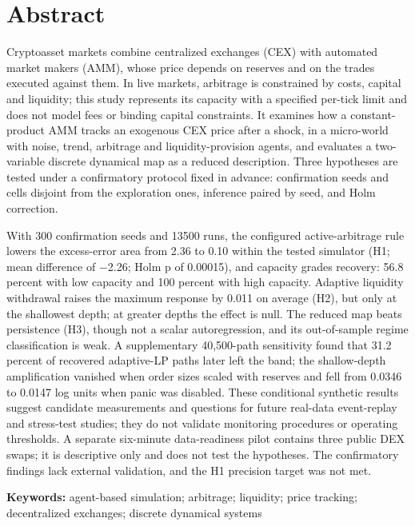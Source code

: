 \section{Abstract}

Cryptoasset markets combine centralized exchanges (CEX) with automated market makers (AMM), whose price depends on reserves and on the trades executed against them. In live markets, arbitrage is constrained by costs, capital and liquidity; this study represents its capacity with a specified per-tick limit and does not model fees or binding capital constraints. It examines how a constant-product AMM tracks an exogenous CEX price after a shock, in a micro-world with noise, trend, arbitrage and liquidity-provision agents, and evaluates a two-variable discrete dynamical map as a reduced description. Three hypotheses are tested under a confirmatory protocol fixed in advance: confirmation seeds and cells disjoint from the exploration ones, inference paired by seed, and Holm correction.

With 300 confirmation seeds and 13500 runs, the configured active-arbitrage rule lowers the excess-error area from 2.36 to 0.10 within the tested simulator (H1; mean difference of −2.26; Holm p of 0.00015), and capacity grades recovery: 56.8 percent with low capacity and 100 percent with high capacity. Adaptive liquidity withdrawal raises the maximum response by 0.011 on average (H2), but only at the shallowest depth; at greater depths the effect is null. The reduced map beats persistence (H3), though not a scalar autoregression, and its out-of-sample regime classification is weak. A supplementary 40,500-path sensitivity found that 31.2 percent of recovered adaptive-LP paths later left the band; the shallow-depth amplification vanished when order sizes scaled with reserves and fell from 0.0346 to 0.0147 log units when panic was disabled. These conditional synthetic results suggest candidate measurements and questions for future real-data event-replay and stress-test studies; they do not validate monitoring procedures or operating thresholds. A separate six-minute data-readiness pilot contains three public DEX swaps; it is descriptive only and does not test the hypotheses. The confirmatory findings lack external validation, and the H1 precision target was not met.

\textbf{Keywords:} agent-based simulation; arbitrage; liquidity; price tracking; decentralized exchanges; discrete dynamical systems

